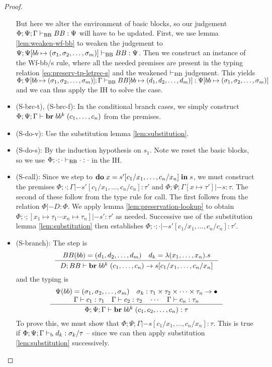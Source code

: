 \documentclass[a4paper, oneside, 10pt, draft]{memoir}
\begin{document}
\begin{proof}
\begin{itemize}
    But here we alter the environment of basic blocks, so our
    judgement $\Phi;\Psi;\Gamma |-_{\mathrm{BB}} BB : \Psi$ will have to be
    updated. First, we use lemma \ref{lem:weaken-wf-bb} to weaken
    the judgement to $\Psi;\Psi[bb \mapsto (\sigma_1, \sigma_2, \dotsc, \sigma_m)] |-_{\mathrm{BB}} BB :
    \Psi$. Then we construct an instance of the Wf-bb/s rule, where all the
    needed premises are present in the typing relation
    \eqref{eq:preserv-tp-letrec-s} and the weakened $|-_{\mathrm{BB}}$
    judgement. This yields $\Phi;\Psi[bb \mapsto (\sigma_1, \sigma_2, \dotsc, \sigma_m)];\Gamma
    |-_{\mathrm{BB}} BB[bb \mapsto (d_1, d_2, \dotsc, d_m)] : \Psi[bb \mapsto (\sigma_1, \sigma_2, \dotsc, \sigma_m)]$ and we
    can thus apply the IH to solve the case.
  \item (S-brc-t), (S-brc-f):
    In the conditional branch cases, we simply construct
    $\Phi;\Psi;\Gamma |- \mathbf{br} \; bb^k \; (c_1, \dotsc, c_n)$ from the
    premises.
  \item (S-do-v):
    Use the substitution lemma \ref{lem:substitution}.
  \item (S-do-s):
    By the induction hypothesis on $s_1$. Note we reset the basic
    blocks, so we use $\Phi;\cdot;\cdot |-_{\mathrm{BB}} \cdot : \cdot$ in the IH.
  \item (S-call): Since we step to
    $\mathbf{do} \; x = s'[c_1/x_1,\dotsc,c_n/x_n] \; \mathbf{in} \; s$, we must construct the
    premises $\Phi;\cdot;\Gamma |- s'[c_1/x_1,\dotsc,c_n/c_n] : \tau'$
    and $\Phi;\Psi;\Gamma[x \mapsto \tau'] |- s : \tau$. The second of
    these follow from the type rule for call. The first follows from
    the relation $\Phi |- D : \Phi$. We apply lemma
    \ref{lem:preservation-lookup} to obtain $\Phi;\cdot;[x_1
    \mapsto \tau_1 \dotsb x_n \mapsto \tau_n] |- s' : \tau'$ as
    needed. Successive use of the substitution lemma
    \ref{lem:substitution} then establishes $\Phi;\cdot;\cdot |-
    s'[c_1/x_1,\dotsc,c_n/c_n] : \tau'$.
  \item (S-branch):
    The step is
    \begin{equation*}
      \inference{BB(bb) = \dbundle \quad d_k = \lambda(x_1, \dotsc,
        x_n).s}
      {D;BB |- \ibr{bb^k}{(c_1, \dotsc, c_n)} -> s[c_1/x_1, \dotsc, c_n/x_n]}
    \end{equation*}
    and the typing is
    \begin{equation*}
      \inference{\Psi(bb) = \bbtypes{} \quad \sigma_k :
        \ntypes -> \bullet\\
        \Gamma |- c_1 : \tau_1 \quad \Gamma |- c_2 : \tau_2 \quad \dotsb
        \quad \Gamma |- c_n : \tau_n}
      {\Phi;\Psi;\Gamma |- \ibr{bb^k}(c_1, c_2, \dotsc, c_n) : \tau}
    \end{equation*}
    To prove this, we must show that $\Phi;\Psi;\Gamma |-
    s[c_1/x_1,\dotsc,c_n/x_n] : \tau$. This is true if
    $\Phi;\Psi;\Gamma |-_{\mathrm{b}} d_k : \sigma_k / \tau$ -- since we can then
    apply substitution \ref{lem:substitution} successively.


\end{itemize}
\end{proof}
\end{document}
